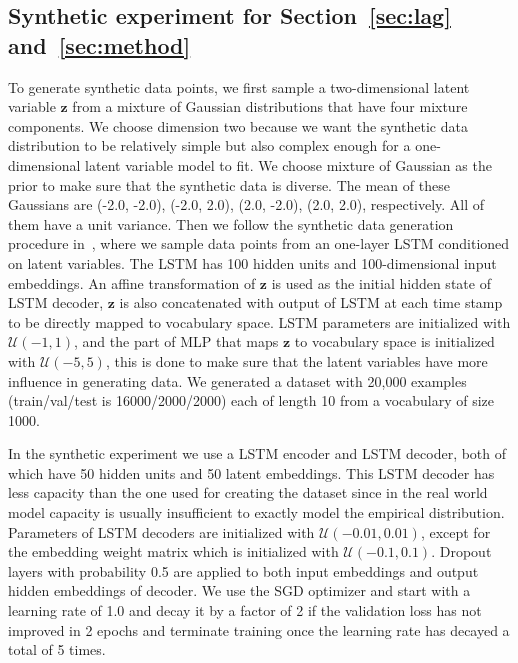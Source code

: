 \documentclass{article} \usepackage{iclr2019_conference,times}
\def\rvz{{\mathbf{z}}}
\def\gU{{\mathcal{U}}}
\newcommand{\z}{\rvz}
\begin{document}
\subsection{Synthetic experiment for Section~\ref{sec:lag} and~\ref{sec:method}}\label{apdix:synthetic}
To generate synthetic data points, we first sample a two-dimensional latent variable $\z$ from a mixture of Gaussian distributions that have four mixture components. We choose dimension two because we want the synthetic data distribution to be relatively simple but also complex enough for a one-dimensional latent variable model to fit. We choose mixture of Gaussian as the prior to make sure that the synthetic data is diverse. The mean of these Gaussians are (-2.0, -2.0), (-2.0, 2.0), (2.0, -2.0), (2.0, 2.0), respectively. All of them have a unit variance. Then we follow the synthetic data generation procedure in~\citet{kim2018semi}, where we sample data points from an one-layer LSTM conditioned on latent variables. The LSTM has 100 hidden units and 100-dimensional input embeddings. An affine transformation of $\z$ is used as the initial hidden state of LSTM decoder, $\z$ is also concatenated with output of LSTM at each time stamp to be directly mapped to vocabulary space. LSTM parameters are initialized with $\gU(-1, 1)$, and the part of MLP that maps $\z$ to vocabulary space is initialized with $\gU(-5, 5)$, this is done to  make sure that the latent variables have more influence in generating data. We generated a dataset with 20,000 examples (train/val/test is 16000/2000/2000) each of length 10 from a vocabulary of size 1000.

In the synthetic experiment we use a LSTM encoder and LSTM decoder, both of which have 50 hidden units and 50 latent embeddings. This LSTM decoder has less capacity than the one used for creating the dataset since in the real world model capacity is usually insufficient to exactly model the empirical distribution. Parameters of LSTM decoders are initialized with $\gU(-0.01, 0.01)$, except for the embedding weight matrix which is initialized with $\gU(-0.1, 0.1)$. Dropout layers with probability 0.5 are applied to both input embeddings and output hidden embeddings of decoder. We use the SGD optimizer and start with a learning rate of 1.0 and decay it by a factor of 2 if the validation loss has not improved in 2 epochs and terminate training once the learning rate has decayed a total of 5 times. 
\end{document}
